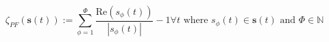 \begin{equation}
	\zeta_{PF}(\textbf{s}(t)):= \sum_{\phi=1}^{\Phi}\frac{\text{Re}(s_\phi(t))}{|s_\phi(t)|} - 1 \forall t \text{ where } s_\phi(t) \in \textbf{s}(t) \text{ and } \Phi \in \mathbb{N}
\label{ch1:equ:power-factor}
\end{equation}